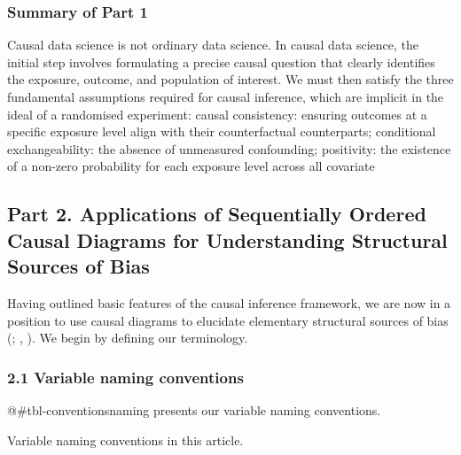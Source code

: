 \documentclass[
  singlecolumn]{article}
\begin{document}
\subsubsection{Summary of Part 1}\label{summary-of-part-1}

Causal data science is not ordinary data science. In causal data
science, the initial step involves formulating a precise causal question
that clearly identifies the exposure, outcome, and population of
interest. We must then satisfy the three fundamental assumptions
required for causal inference, which are implicit in the ideal of a
randomised experiment: causal consistency: ensuring outcomes at a
specific exposure level align with their counterfactual counterparts;
conditional exchangeability: the absence of unmeasured confounding;
positivity: the existence of a non-zero probability for each exposure
level across all covariate

\subsection{Part 2. Applications of Sequentially Ordered Causal Diagrams
for Understanding Structural Sources of
Bias}\label{part-2.-applications-of-sequentially-ordered-causal-diagrams-for-understanding-structural-sources-of-bias}

Having outlined basic features of the causal inference framework, we are
now in a position to use causal diagrams to elucidate elementary
structural sources of bias (; ,
). We begin by defining our terminology.

\subsubsection{2.1 Variable naming
conventions}\label{variable-naming-conventions}

@\#tbl-conventionsnaming presents our variable naming conventions.

\begin{table}

\caption{\label{tbl-conventionsnaming}Variable naming conventions in
this article.}

\centering{

\terminologylocalconventions 

}

\end{table}%
\end{document}
